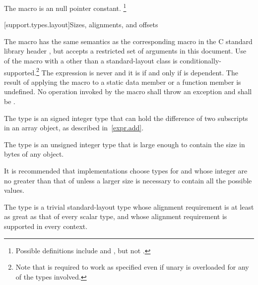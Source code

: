 \pnum
The macro 
is an  null pointer constant.%
\footnote{Possible definitions include
and
,
but not
.}


[support.types.layout]{Sizes, alignments, and offsets}

\pnum
The macro
has the same semantics as the corresponding macro in
the C standard library header , but
accepts a restricted set of 
arguments in this document.
Use of the  macro with a 
other than a standard-layout class
is conditionally-supported.\footnote{Note that 
is required to work as specified even if unary
is overloaded for any of the types involved.}
The expression 
is never  and it is
 if and only if  is
dependent. The result of applying the  macro to
a static data member or a function member is undefined.
No operation invoked by the  macro shall throw an exception and
 shall be .

\pnum
The type  is an
signed integer type that can
hold the difference of two subscripts in an array object, as described in~\ref{expr.add}.

\pnum
The type  is an
unsigned integer type that is large enough
to contain the size in bytes of any object.

\pnum
\begin{note}
It is recommended that implementations choose types for  and 
whose integer  are no greater than that of
 unless a larger size is necessary to contain all the possible values.
\end{note}

\pnum
The type
%
 is a trivial standard-layout type whose alignment requirement
is at least as great as that of every scalar type, and whose alignment
requirement is supported in every context.

